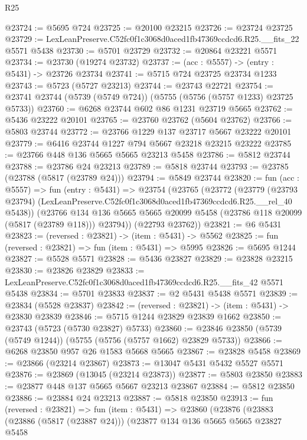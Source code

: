 \begin{lexlean}{R25}
\begin{coremodule}
@23724 := @5695 @724
@23725 := @20100 @23215
@23726 := @23724 @23725
@23729 := LexLeanPreserve.C52fc0f1c3068d0aced1fb47369ccdcd6.R25.__fits_22 @5571 @5438
@23730 := @5701 @23729
@23732 := @20864 @23221 @5571
@23734 := @23730 (@19274 @23732)
@23737 := (acc : @5557) -> (entry : @5431) -> @23726 @23734
@23741 := @5715 @724 @23725 @23734 @1233
@23743 := @5723 (@5727 @23213)
@23744 := @23743 @22721
@23754 := @23741 @23744 (@5739 (@5749 @724)) (@5755 (@5756 (@5757 @1233) @23725 @5733))
@23760 := @6268 @23744 @602 @86 @1231 @23719 @5665
@23762 := @5436 @23222 @20101
@23765 := @23760 @23762 (@5604 @23762)
@23766 := @5803 @23744
@23772 := @23766 @1229 @137 @23717 @5667 @23222 @20101
@23779 := @6416 @23744 @1227 @794 @5667 @23218 @23215 @23222
@23785 := @23766 @448 @136 @5665 @5665 @23213 @5458
@23786 := @5812 @23744
@23788 := @23786 @24 @23213
@23789 := @5818 @23744
@23793 := @23785 (@23788 (@5817 (@23789 @24)))
@23794 := @5849 @23744
@23820 := fun (acc : @5557) =>
  fun (entry : @5431) =>
  @23754
    (@23765
      (@23772
        (@23779
          (@23793 @23794)
          (LexLeanPreserve.C52fc0f1c3068d0aced1fb47369ccdcd6.R25.__rel_40 @5438))
        (@23766
          @134
          @136
          @5665
          @5665
          @20099
          @5458
          (@23786 @118 @20099 (@5817 (@23789 @118)))
          @23794))
      (@22793 @23762))
@23821 := @6 @5431
@23823 := (reversed : @23821) -> (item : @5431) -> @5562
@23825 := fun (reversed : @23821) => fun (item : @5431) => @5995
@23826 := @5695 @1244
@23827 := @5528 @5571
@23828 := @5436 @23827
@23829 := @23828 @23215
@23830 := @23826 @23829
@23833 := LexLeanPreserve.C52fc0f1c3068d0aced1fb47369ccdcd6.R25.__fits_42 @5571 @5438
@23834 := @5701 @23833
@23837 := @2 @5431 @5438 @5571
@23839 := @23834 (@5528 @23837)
@23842 := (reversed : @23821) -> (item : @5431) -> @23830 @23839
@23846 := @5715 @1244 @23829 @23839 @1662
@23850 := @23743 (@5723 (@5730 @23827) @5733)
@23860 := @23846 @23850 (@5739 (@5749 @1244)) (@5755 (@5756 (@5757 @1662) @23829 @5733))
@23866 := @6268 @23850 @957 @26 @1583 @5668 @5665
@23867 := @23828 @5458
@23869 := @23866 (@23214 @23867)
@23873 := @13047 @5431 @5432 @5527 @5571
@23876 := @23869 (@13045 (@23214 @23873))
@23877 := @5803 @23850
@23883 := @23877 @448 @137 @5665 @5667 @23213 @23867
@23884 := @5812 @23850
@23886 := @23884 @24 @23213
@23887 := @5818 @23850
@23913 := fun (reversed : @23821) =>
  fun (item : @5431) =>
  @23860
    (@23876
      (@23883
        (@23886 (@5817 (@23887 @24)))
        (@23877
          @134
          @136
          @5665
          @5665
          @23827
          @5458

\end{coremodule}
\end{lexlean}
